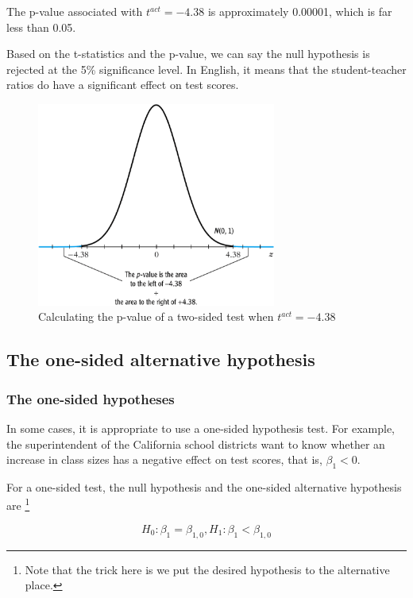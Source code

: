 \documentclass[a4paper,11pt]{article}
\begin{document}
The p-value associated with \(t^{act} = -4.38\) is approximately
0.00001, which is far less than 0.05. 

Based on the t-statistics and the p-value, we can say the null
hypothesis is rejected at the 5\% significance level. In English, it
means that the student-teacher ratios do have a significant effect on
test scores. 

\begin{figure}[htbp]
\centering
\includegraphics[width=0.7\textwidth]{figure/fig-5-1.png}
\caption{\label{fig:org6102735}
Calculating the p-value of a two-sided test when \(t^{act}=-4.38\)}
\end{figure}


\subsection{The one-sided alternative hypothesis}
\label{sec:orgb46e1dd}

\subsubsection*{The one-sided hypotheses}
\label{sec:orge8df58a}

In some cases, it is appropriate to use a one-sided hypothesis
test. For example, the superintendent of the California school
districts want to know whether an increase in class sizes has a
negative effect on test scores, that is, \(\beta_1 < 0\).

For a one-sided test, the null hypothesis and the one-sided
alternative hypothesis are \footnote{Note that the trick here is we put the
desired hypothesis to the alternative place.}

\[ H_0: \beta_1 = \beta_{1,0}, H_1: \beta_1 < \beta_{1,0} \]
\end{document}
